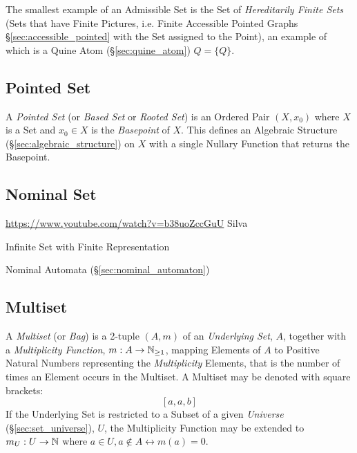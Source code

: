 The smallest example of an Admissible Set is the Set of \emph{Hereditarily
  Finite Sets} (Sets that have Finite Pictures, i.e. Finite Accessible Pointed
Graphs \S\ref{sec:accessible_pointed} with the Set assigned to the Point), an
example of which is a Quine Atom (\S\ref{sec:quine_atom}) $Q = \{Q\}$.
\cite{aczel88} %



\subsection{Pointed Set}\label{sec:pointed_set}

A \emph{Pointed Set} (or \emph{Based Set} or \emph{Rooted Set}) is an Ordered
Pair $(X, x_0)$ where $X$ is a Set and $x_0 \in X$ is the \emph{Basepoint} of
$X$. This defines an Algebraic Structure (\S\ref{sec:algebraic_structure}) on
$X$ with a single Nullary Function that returns the Basepoint.



\subsection{Nominal Set}\label{sec:nominal_set}

\url{https://www.youtube.com/watch?v=b38uoZccGuU} Silva

Infinite Set with Finite Representation

Nominal Automata (\S\ref{sec:nominal_automaton})



\subsection{Multiset}\label{sec:multiset}

A \emph{Multiset} (or \emph{Bag}) is a 2-tuple $(A,m)$ of an
\emph{Underlying Set}, $A$, together with a \emph{Multiplicity
  Function}, $m : A \rightarrow \mathbb{N}_{\geq 1}$, mapping Elements
of $A$ to Positive Natural Numbers representing the
\emph{Multiplicity} Elements, that is the number of times an Element
occurs in the Multiset. A Multiset may be denoted with square
brackets:
\[
  [a,a,b]
\]
If the Underlying Set is restricted to a Subset of a given
\emph{Universe} (\S\ref{sec:set_universe}), $U$, the Multiplicity
Function may be extended to $m_U : U \rightarrow \mathbb{N}$ where $a \in
U, a \notin A \leftrightarrow m(a)=0$.

